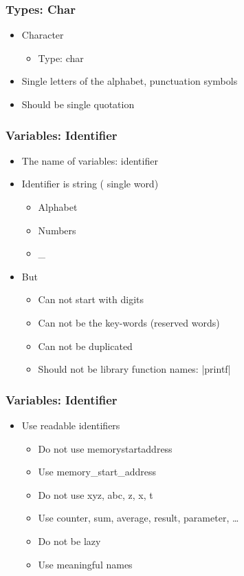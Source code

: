 \documentclass{../c-lecture}
\begin{document}
\begin{frame}
  \frametitle{Types: Char}
  \begin{itemize}
    \item Character
    \begin{itemize}
      \item Type: char
    \end{itemize}
    \item Single letters of the alphabet, punctuation symbols
    \item Should be single quotation
  \end{itemize}
\end{frame}

\begin{frame}
  \frametitle{Variables: Identifier}
  \begin{itemize}
    \item The name of variables: {\color{Orange} identifier}
    \item Identifier is string ({\color{Green} single word})
    \begin{itemize}
      \item Alphabet
      \item Numbers
      \item \_
    \end{itemize}
    \item But
    \begin{itemize}
      \item Can {\color{Cyan} not} start with digits
      \item Can {\color{Cyan} not} be the key-words (reserved
        words)
      \item Can {\color{Cyan} not} be duplicated
      \item Should {\color{Cyan} not} be library function names: |printf|
    \end{itemize}
  \end{itemize}
\end{frame}

\begin{frame}
  \frametitle{Variables: Identifier}
  \begin{itemize}
    \item Use readable identifiers
    \begin{itemize}
      \item Do not use memorystartaddress
      \item Use memory\_start\_address
      \item Do not use xyz, abc, z, x, t
      \item Use counter, sum, average, result, parameter, \ldots
      \item Do not be lazy
      \item Use meaningful names
    \end{itemize}
  \end{itemize}
\end{frame}
\end{document}
